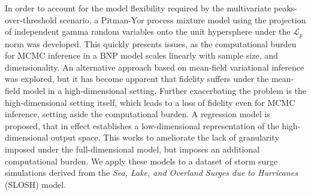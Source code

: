 In order to account for the model flexibility required by the multivariate
    peaks-over-threshold scenario, a Pitman-Yor process mixture model using
    the projection of independent gamma random variables onto the unit 
    hypersphere under the $\mathcal{L}_p$ norm was developed.  This quickly
    presents issues, as the computational burden for MCMC inference in a BNP
    model scales linearly with sample size, and dimensionality.
    An alternative approach based on mean-field variational inference was explored,
    but it has become apparent that fidelity suffers under the mean-field model
    in a high-dimensional setting.  Further exacerbating the problem is the
    high-dimensional setting itself, which leads to a loss of fidelity even for
    MCMC inference, setting aside the computational burden.  A regression model
    is proposed, that in effect establishes a low-dimensional representation of the 
    high-dimensional output space.  This works to ameliorate the lack of granularity
    imposed under the full-dimensional model, but imposes an additional computational
    burden.  We apply these models to a dataset of storm surge simulations 
    derived from the \emph{Sea, Lake, and Overland Surges due to Hurricanes} 
    (SLOSH) model.
    
    
